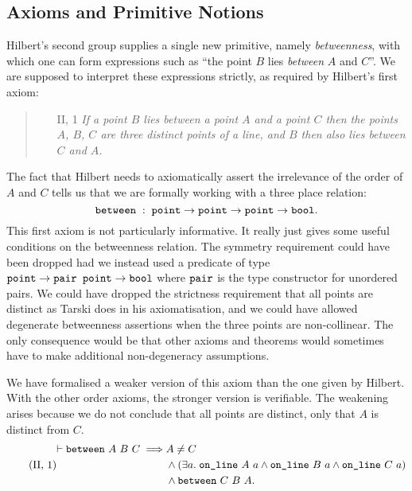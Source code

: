\subsection{Axioms and Primitive Notions}
Hilbert's second group supplies a single new primitive, namely \emph{betweenness}, with which one can form expressions such as ``the point $B$ lies \emph{between} $A$ and $C$''. We are supposed to interpret these expressions strictly, as required by Hilbert's first axiom:
\begin{quotation}
\mbox{}\vspace{-1\baselineskip}
\begin{enumerate}
\item[II, 1] \emph{If a point $B$ lies between a point $A$ and a point $C$ then the points $A$, $B$, $C$ are three distinct points of a line, and $B$ then also lies between $C$ and $A$.}
\end{enumerate}
\end{quotation}
The fact that Hilbert needs to axiomatically assert the irrelevance of the order of $A$ and $C$ tells us that we are formally working with a three place relation:
\begin{displaymath}
\texttt{between}\;:\;\texttt{point}\rightarrow\texttt{point}\rightarrow\texttt{point}\rightarrow\texttt{bool}.
\end{displaymath}
This first axiom is not particularly informative. It really just gives some useful conditions on the betweenness relation. The symmetry requirement could have been dropped had we instead used a predicate of type $\texttt{point}\rightarrow \texttt{pair point} \rightarrow \texttt{bool}$ where $\texttt{pair}$ is the type constructor for unordered pairs. We could have dropped the strictness requirement that all points are distinct as Tarski does in his axiomatisation, and we could have allowed degenerate betweenness assertions when the three points are non-collinear. The only consequence would be that other axioms and theorems would sometimes have to make additional non-degeneracy assumptions.

We have formalised a weaker version of this axiom than the one given by Hilbert. With the other order axioms, the stronger version is verifiable. The weakening arises because we do not conclude that all points are distinct, only that $A$ is distinct from $C$.
\begin{equation}\label{eq:g21}
 \tag{II,~1}
  \begin{split}
    \vdash\texttt{between}\ A\ B\ C \implies & A \neq C\\
                               & \wedge (\exists a.\; \texttt{on\_line}\ A\ a \wedge \texttt{on\_line}\ B\ a \wedge \texttt{on\_line}\ C\ a)\\
                               & \wedge \texttt{between}\ C\ B\ A.
  \end{split}
\end{equation}

